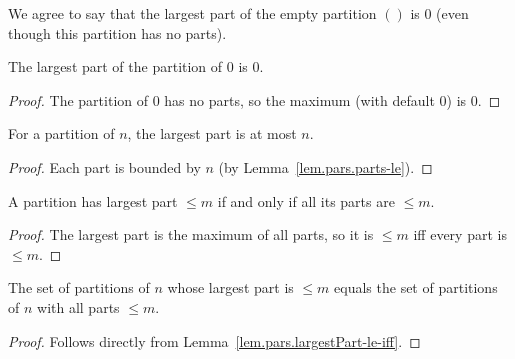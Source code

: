 \begin{convention}
\label{conv.pars.largest-part-0}
\leanok
We agree to say that the largest part of the
empty partition $\left(  {}\right)  $ is $0$ (even though this partition has
no parts).
\end{convention}

\begin{lemma}
\label{lem.pars.largestPart-zero}
\leanhelper
\leanok
The largest part of the partition of $0$ is $0$.
\end{lemma}

\begin{proof}
\leanok
The partition of $0$ has no parts, so the maximum (with default $0$) is $0$.
\end{proof}

\begin{lemma}
\label{lem.pars.largestPart-le}
\leanhelper
\leanok
For a partition of $n$, the largest part is at most $n$.
\end{lemma}

\begin{proof}
\leanok
Each part is bounded by $n$ (by Lemma~\ref{lem.pars.parts-le}).
\end{proof}

\begin{lemma}
\label{lem.pars.largestPart-le-iff}
\leanhelper
\leanok
A partition has largest part $\leq m$ if and only if all its parts are $\leq m$.
\end{lemma}

\begin{proof}
\leanok
The largest part is the maximum of all parts, so it is $\leq m$ iff every part is $\leq m$.
\end{proof}

\begin{lemma}
\label{lem.pars.filter-largestPart-le-eq-restricted}
\leanhelper
\leanok
The set of partitions of $n$ whose largest part is $\le m$ equals
the set of partitions of $n$ with all parts $\le m$.
\end{lemma}

\begin{proof}
Follows directly from Lemma~\ref{lem.pars.largestPart-le-iff}.
\end{proof}

